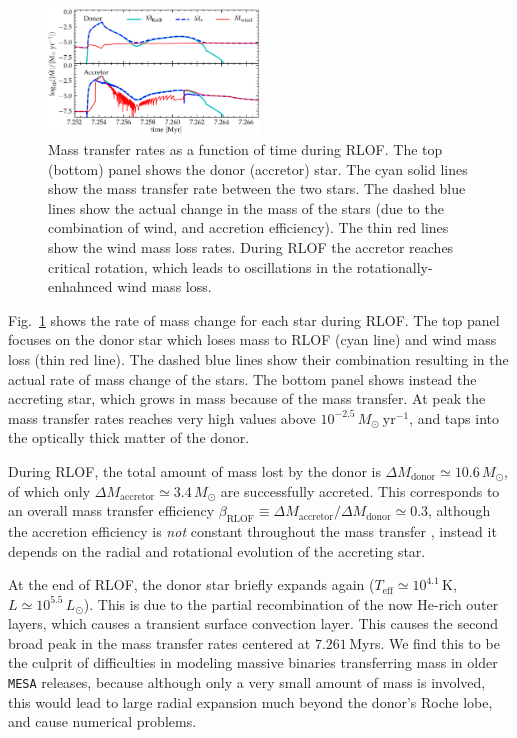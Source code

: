 \documentclass[twocolumn,twocolappendix,trackchanges]{aastex63}
\DeclareRobustCommand{\Figref}[1]{Fig.~\ref{#1}}
\begin{document}
\begin{figure}[htbp]
  \includegraphics[width=0.5\textwidth]{MT}
  \caption{Mass transfer rates as a function of time during RLOF. The top (bottom) panel
    shows the donor (accretor) star. The cyan solid lines show the
    mass transfer rate between the two stars. The dashed blue lines
    show the actual change in the mass of the stars (due to the
    combination of wind, and accretion efficiency). The thin red
    lines show the wind mass loss rates. During RLOF the accretor
    reaches critical rotation, which leads to oscillations in the
    rotationally-enhahnced wind mass loss.}
  \label{fig:MT}
\end{figure}

\Figref{fig:MT} shows the rate of mass change for each star
during RLOF. The top panel focuses on the donor star
which loses mass to RLOF (cyan line) and wind mass loss (thin red
line). The dashed blue lines show their combination resulting in the
actual rate of mass change of the stars.
The bottom panel shows instead the accreting star, which grows in mass
because of the mass transfer. At peak the mass transfer rates reaches very high
values above $10^{-2.5}\,M_\odot\ \mathrm{yr^{-1}}$, and taps into the
optically thick matter of the donor.

During RLOF, the total amount of mass lost by the donor is
$\Delta M_\mathrm{donor} \simeq 10.6\,M_\odot$, of which only
$\Delta M_\mathrm{accretor}\simeq 3.4\,M_\odot$ are successfully
accreted. This corresponds to an overall mass
transfer efficiency
$\beta_\mathrm{RLOF}\equiv \Delta M_\mathrm{accretor}/\Delta M_\mathrm{donor} \simeq 0.3$,
although the accretion efficiency is \emph{not} constant throughout the
mass transfer \citep[e.g.,][]{vanrensbergen:06}, instead it depends on the radial and rotational evolution of
the accreting star.

At the end of RLOF, the donor star briefly expands again
($T_\mathrm{eff}\simeq10^{4.1}$\,K, $L\simeq10^{5.5}\,L_\odot$). This
is due to the partial recombination of the now He-rich outer layers,
which causes a transient surface convection layer. This causes the
second broad peak in the mass transfer rates centered at $7.261$\,Myrs. We
find this to be the culprit of difficulties in modeling massive
binaries transferring mass in older \texttt{MESA} releases, because
although only a very small amount of mass is involved, this would lead
to large radial expansion much beyond the donor's Roche lobe, and
cause numerical problems.
\end{document}
